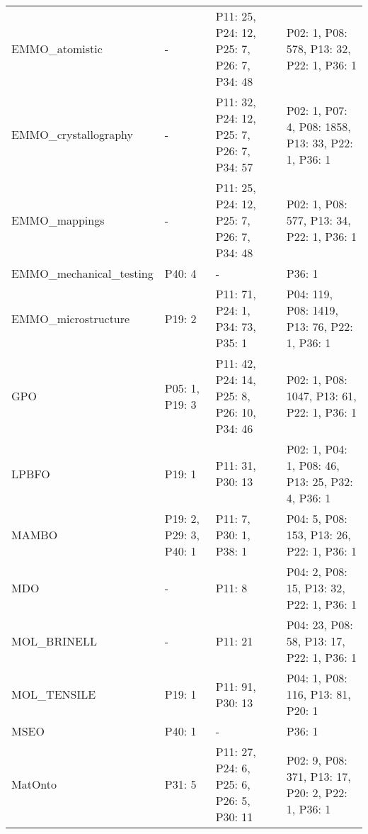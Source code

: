 \begin{tabular}{m{4cm}m{3cm}m{3cm}m{5cm}}
         EMMO_atomistic &                       - &                P11: 25, P24: 12, P25: 7, P26: 7, P34: 48 &                  P02: 1, P08: 578, P13: 32, P22: 1, P36: 1 \\
   EMMO_crystallography &                       - &                P11: 32, P24: 12, P25: 7, P26: 7, P34: 57 &         P02: 1, P07: 4, P08: 1858, P13: 33, P22: 1, P36: 1 \\
          EMMO_mappings &                       - &                P11: 25, P24: 12, P25: 7, P26: 7, P34: 48 &                  P02: 1, P08: 577, P13: 34, P22: 1, P36: 1 \\
EMMO_mechanical_testing &                  P40: 4 &                                                        - &                                                     P36: 1 \\
    EMMO_microstructure &                  P19: 2 &                         P11: 71, P24: 1, P34: 73, P35: 1 &               P04: 119, P08: 1419, P13: 76, P22: 1, P36: 1 \\
                    GPO &          P05: 1, P19: 3 &               P11: 42, P24: 14, P25: 8, P26: 10, P34: 46 &                 P02: 1, P08: 1047, P13: 61, P22: 1, P36: 1 \\
                  LPBFO &                  P19: 1 &                                         P11: 31, P30: 13 &           P02: 1, P04: 1, P08: 46, P13: 25, P32: 4, P36: 1 \\
                  MAMBO &  P19: 2, P29: 3, P40: 1 &                                   P11: 7, P30: 1, P38: 1 &                  P04: 5, P08: 153, P13: 26, P22: 1, P36: 1 \\
                    MDO &                       - &                                                   P11: 8 &                   P04: 2, P08: 15, P13: 32, P22: 1, P36: 1 \\
            MOL_BRINELL &                       - &                                                  P11: 21 &                  P04: 23, P08: 58, P13: 17, P22: 1, P36: 1 \\
            MOL_TENSILE &                  P19: 1 &                                         P11: 91, P30: 13 &                          P04: 1, P08: 116, P13: 81, P20: 1 \\
                   MSEO &                  P40: 1 &                                                        - &                                                     P36: 1 \\
                MatOnto &                  P31: 5 &                 P11: 27, P24: 6, P25: 6, P26: 5, P30: 11 &          P02: 9, P08: 371, P13: 17, P20: 2, P22: 1, P36: 1 \\

\end{tabular}
